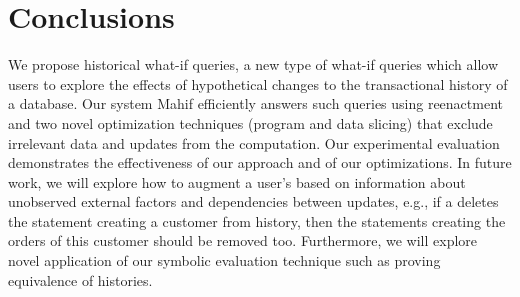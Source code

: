 \section{Conclusions}
\label{sec:conclusions}

We propose historical what-if queries, a new type of what-if queries which allow users to explore the effects of hypothetical changes to the transactional history of a database. Our system Mahif efficiently answers such queries using reenactment %
and  two novel optimization  techniques (program and data slicing) that exclude irrelevant data and updates from the computation.
Our experimental evaluation demonstrates the effectiveness of our approach and of our optimizations.
In future work, we will explore how to augment a user's \abbrHW based on information about unobserved external factors and dependencies between updates, e.g., if a \abbrHW deletes the statement creating a customer from history, then the statements creating the orders of this customer should be removed too. Furthermore, we will explore novel application of our symbolic evaluation technique such as proving equivalence of histories.

